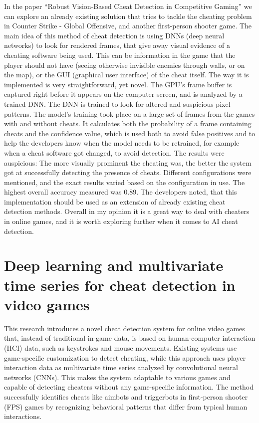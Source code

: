 In the paper “Robust Vision-Based Cheat Detection in Competitive Gaming” we can explore an
already existing solution that tries to tackle the cheating problem in Counter Strike - Global
Offensive, and another first-person shooter game. The main idea of this method of cheat
detection is using DNNs (deep neural networks) to look for rendered frames, that give away
visual evidence of a cheating software being used. This can be information in the game that the
player should not have (seeing otherwise invisible enemies through walls, or on the map), or the
GUI (graphical user interface) of the cheat itself. \newline
The way it is implemented is very straightforward, yet novel. The GPU’s frame buffer is captured
right before it appears on the computer screen, and is analyzed by a trained DNN. The DNN is
trained to look for altered and suspicious pixel patterns. The model's training took place on a
large set of frames from the games with and without cheats. It calculates both the probability of
a frame containing cheats and the confidence value, which is used both to avoid false positives
and to help the developers know when the model needs to be retrained, for example when a
cheat software got changed, to avoid detection. \newline
The results were auspicious: The more visually prominent the cheating was, the better the
system got at successfully detecting the presence of cheats. Different configurations were
mentioned, and the exact results varied based on the configuration in use. The highest overall
accuracy measured was 0.89.
The developers noted, that this implementation should be used as an extension of already
existing cheat detection methods. Overall in my opinion it is a great way to deal with cheaters in
online games, and it is worth exploring further when it comes to AI cheat detection.

\section{Deep learning and multivariate time series for cheat detection in video games \cite{pinto2021deep}}

This research introduces a novel cheat detection system for online video games that, instead of traditional in-game data, is based on human-computer interaction (HCI) data, such as keystrokes and mouse movements. Existing systems use game-specific customization to detect cheating, while this approach uses player interaction data as multivariate time series analyzed by convolutional neural networks (CNNs). This makes the system adaptable to various games and capable of detecting cheaters without any game-specific information. The method successfully identifies cheats like aimbots and triggerbots in first-person shooter (FPS) games by recognizing behavioral patterns that differ from typical human interactions.

